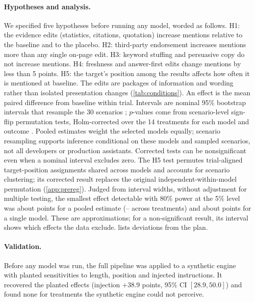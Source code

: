 \documentclass[11pt]{article}
\begin{document}
\paragraph{Hypotheses and analysis.} We specified five hypotheses before running any model, worded as follows. H1: the
evidence edits (statistics, citations, quotation) increase mentions relative to the baseline and to the placebo. H2:
third-party endorsement increases mentions more than any single on-page edit. H3: keyword stuffing and persuasive copy
do not increase mentions. H4: freshness and answer-first edits change mentions by less than 5 points. H5: the target's
position among the results affects how often it is mentioned at baseline. The edits are packages of information and
wording rather than isolated presentation changes (\cref{tab:conditions}). An effect is the mean paired difference from baseline within trial. Intervals are
nominal 95\% bootstrap intervals that resample the 30 scenarios \citep{cameron2008bootstrap}; $p$-values come from
scenario-level sign-flip permutation tests, Holm-corrected over the 14 treatments for each model and outcome
\citep{holm1979}. Pooled estimates weight the selected models equally; scenario resampling supports inference
conditional on these models and sampled scenarios, not all developers or production assistants. Corrected tests can be
nonsignificant even when a nominal interval excludes zero. The H5 test permutes trial-aligned target-position
assignments shared across models and accounts for scenario clustering; its corrected result replaces the original
independent-within-model permutation (\cref{app:prereg}). Judged from interval widths, without adjustment for multiple
testing, the smallest effect detectable with 80\% power at the 5\% level was about \MdeMainPooled{} points for a pooled
estimate (\MdeMainPooledMin--\MdeMainPooledMax{} across treatments) and about \MdeMainModel{} points for a single model.
These are approximations; for a non-significant result, its interval shows which effects the data exclude.  lists deviations from the plan.

\paragraph{Validation.} Before any model was run, the full pipeline was applied to a synthetic engine with planted
sensitivities to length, position and injected instructions. It recovered the planted effects (injection $+38.9$
points, 95\% CI $[28.9, 50.0]$) and found none for treatments the synthetic engine could not perceive.
\end{document}
